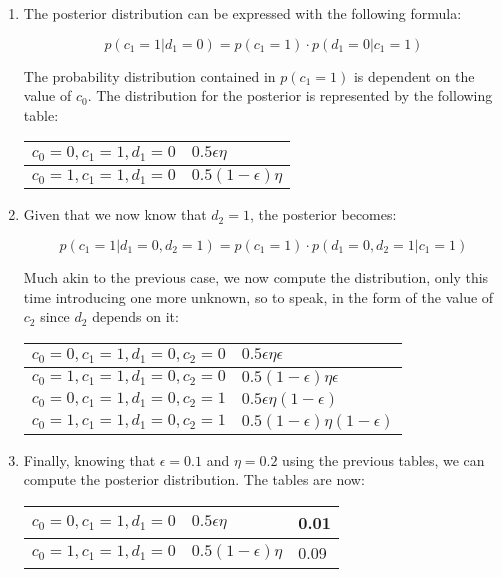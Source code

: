 \documentclass[12pt]{article}
\begin{document}
\begin{enumerate}[label=(\alph*)]
	\item The posterior distribution can be expressed with the following formula:

		\[
			p(c_1 = 1 | d_1 = 0) = p(c_1 = 1) \cdot p(d_1 = 0 | c_1 = 1)
		\]

		The probability distribution contained in \(p(c_1 = 1)\) is dependent
		on the value of \(c_0\). The distribution for the posterior is
		represented by the following table:

		\begin{tabular}{| l | l |}
			\hline
			\(c_0 = 0, c_1 = 1, d_1 = 0\) & \(0.5 \epsilon \eta\)\\ \hline
			\(c_0 = 1, c_1 = 1, d_1 = 0\) & \(0.5 (1-\epsilon) \eta\)\\ \hline
		\end{tabular}

	\item Given that we now know that \(d_2 = 1\), the posterior becomes:

		\[
			p(c_1 = 1 | d_1 = 0, d_2 = 1) = p(c_1 = 1)
				\cdot p(d_1 = 0, d_2 = 1 | c_1 = 1)
		\]

		Much akin to the previous case, we now compute the distribution, only
		this time introducing one more unknown, so to speak, in the form
		of the value of \(c_2\) since \(d_2\) depends on it:

		\begin{tabular}{| l | l |}
			\hline
			\(c_0 = 0, c_1 = 1, d_1 = 0, c_2 = 0\) &
				\(0.5 \epsilon \eta \epsilon\)\\ \hline
			\(c_0 = 1, c_1 = 1, d_1 = 0, c_2 = 0\) &
				\(0.5 (1-\epsilon) \eta \epsilon\)\\ \hline
			\(c_0 = 0, c_1 = 1, d_1 = 0, c_2 = 1\) &
				\(0.5 \epsilon \eta (1-\epsilon)\)\\ \hline
			\(c_0 = 1, c_1 = 1, d_1 = 0, c_2 = 1\) &
				\(0.5 (1-\epsilon) \eta (1-\epsilon)\)\\ \hline
		\end{tabular}

	\item Finally, knowing that \(\epsilon = 0.1\) and \(\eta = 0.2\) using the 
		previous tables, we can compute the posterior distribution. The
		tables are now:

		\begin{tabular}{| l | l | l |}
			\hline
			\(c_0 = 0, c_1 = 1, d_1 = 0\) & \(0.5 \epsilon \eta\) & 0.01\\ \hline
			\(c_0 = 1, c_1 = 1, d_1 = 0\) & \(0.5 (1-\epsilon) \eta\) & 0.09\\ \hline
		\end{tabular}


\end{enumerate}
\end{document}
